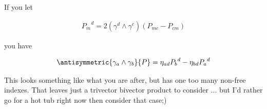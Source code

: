 If you let 

\begin{align*}
{P_m}^d = 2 (\gamma^d \wedge \gamma^c) (P_{m c} -P_{c m})
\end{align*}

you have

\begin{align*}
\antisymmetric{\gamma_a \wedge \gamma_b}{P} = \eta_{ad} {P_b}^d - \eta_{bd} {P_a}^d
\end{align*}

This looks something like what you are after, but has one too many non-free indexes.  That leaves just a trivector bivector product to consider ... but I'd rather go for a hot tub right now then consider that case;)



\EndNoBibArticle
